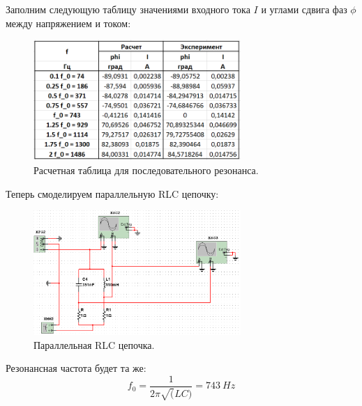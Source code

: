 \documentclass[12pt]{article}
\begin{document}
Заполним следующую таблицу значениями входного тока $I$ и углами сдвига фаз $\phi$ между напряжением и током:
\begin{figure}[H]
    \centering
    \includegraphics[width=0.7\textwidth]{8_table.png}
    \caption{Расчетная таблица для последовательного резонанса.}
    \label{fig:8_table}
\end{figure}

Теперь смоделируем параллельную RLC цепочку:
\begin{figure}[H]
    \centering
    \includegraphics[width=0.7\textwidth]{9_scheme.png}
    \caption{Параллельная RLC цепочка.}
    \label{fig:9_scheme}
\end{figure}

Резонансная частота будет та же:
\[  
    f_0 = \frac{1}{2 \pi \sqrt(LC)} = 743 \ Hz
\]
\end{document}
